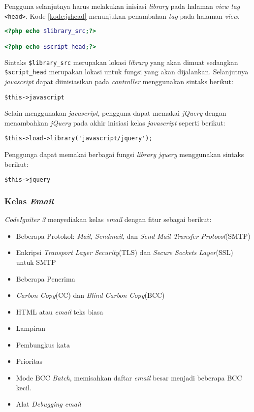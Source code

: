 Pengguna selanjutnya harus melakukan inisiasi \textit{library} pada halaman \textit{view tag} \verb|<head>|. Kode \ref{kode:jshead} menunjukan penambahan \textit{tag} pada halaman \textit{view}.

\begin{lstlisting}[language=PHP, caption=Contoh penambahan \textit{tag} pada \textit{file} \textit{view}, label=kode:jshead]
<?php echo $library_src;?>

<?php echo $script_head;?>
\end{lstlisting}

Sintaks \verb|$library_src| merupakan lokasi \textit{library} yang akan dimuat sedangkan \verb|$script_head| merupakan lokasi untuk fungsi yang akan dijalankan. Selanjutnya \textit{javascript} dapat diinisiasikan pada \textit{controller} menggunakan sintaks berikut:

\begin{center}
	\verb|$this->javascript|
\end{center}

Selain menggunakan \textit{javascript}, pengguna dapat memakai \textit{jQuery} dengan menambahkan \textit{jQuery} pada akhir inisiasi kelas \textit{javascript} seperti berikut:

\begin{center}
\verb|$this->load->library('javascript/jquery');|
\end{center}

Penggunga dapat memakai berbagai fungsi \textit{library jquery} menggunakan sintaks berikut:

\begin{center}
\verb|$this->jquery|
\end{center}

\subsubsection{Kelas \textit{Email}}
\textit{CodeIgniter 3} menyediakan kelas \textit{email} dengan fitur sebagai berikut:

\begin{itemize}
\item Beberapa Protokol: \textit{Mail, Sendmail}, dan \textit{Send Mail Transfer Protocol}(SMTP)
\item Enkripsi \textit{Transport Layer Security}(TLS) dan \textit{Secure Sockets Layer}(SSL) untuk SMTP
\item Beberapa Penerima
\item \textit{Carbon Copy}(CC) dan \textit{Blind Carbon Copy}(BCC)
\item HTML atau \textit{email} teks biasa
\item Lampiran
\item Pembungkus kata
\item Prioritas
\item Mode BCC \textit{Batch}, memisahkan daftar \textit{email} besar menjadi beberapa BCC kecil.
\item Alat \textit{Debugging email}
\end{itemize}


